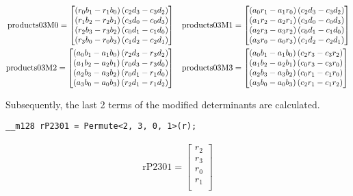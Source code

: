 \begin{align*}
\mathrm{products03M0} 
=
\begin{bmatrix}
\left(r_0b_1 - r_1b_0\right)\left(c_2d_3 - c_3d_2\right)\\
\left(r_1b_2 - r_2b_1\right)\left(c_3d_0 - c_0d_3\right)\\
\left(r_2b_3 - r_3b_2\right)\left(c_0d_1 - c_1d_0\right)\\
\left(r_3b_0 - r_0b_3\right)\left(c_1d_2 - c_2d_1\right)\\
\end{bmatrix}
&&
\mathrm{products03M1} 
&=
\begin{bmatrix}
\left(a_0r_1 - a_1r_0\right)\left(c_2d_3 - c_3d_2\right)\\
\left(a_1r_2 - a_2r_1\right)\left(c_3d_0 - c_0d_3\right)\\
\left(a_2r_3 - a_3r_2\right)\left(c_0d_1 - c_1d_0\right)\\
\left(a_3r_0 - a_0r_3\right)\left(c_1d_2 - c_2d_1\right)\\
\end{bmatrix}
\\
\mathrm{products03M2} 
=
\begin{bmatrix}
\left(a_0b_1 - a_1b_0\right)\left(r_2d_3 - r_3d_2\right)\\
\left(a_1b_2 - a_2b_1\right)\left(r_0d_3 - r_3d_0\right)\\
\left(a_2b_3 - a_3b_2\right)\left(r_0d_1 - r_1d_0\right)\\
\left(a_3b_0 - a_0b_3\right)\left(r_2d_1 - r_1d_2\right)\\
\end{bmatrix}
&&
\mathrm{products03M3} 
&=
\begin{bmatrix}
\left(a_0b_1 - a_1b_0\right)\left(c_2r_3 - c_3r_2\right)\\
\left(a_1b_2 - a_2b_1\right)\left(c_0r_3 - c_3r_0\right)\\
\left(a_2b_3 - a_3b_2\right)\left(c_0r_1 - c_1r_0\right)\\
\left(a_3b_0 - a_0b_3\right)\left(c_2r_1 - c_1r_2\right)\\
\end{bmatrix}
\end{align*}



Subsequently, the last 2 terms of the modified determinants are calculated.
\begin{verbatim}
__m128 rP2301 = Permute<2, 3, 0, 1>(r);
\end{verbatim}

\begin{align*}
\mathrm{rP2301} 
=
\begin{bmatrix}
r_2\\
r_3\\
r_0\\
r_1\\
\end{bmatrix}
\end{align*}

